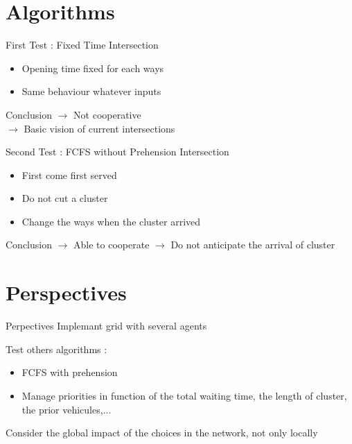 \documentclass[]{beamer}
\begin{document}
\section{Algorithms}
\begin{frame}{First Test : Fixed Time Intersection}
 \begin{itemize}
  \item Opening time fixed for each ways
  \item Same behaviour whatever inputs
 \end{itemize}
 \begin{block}{Conclusion}
  $\rightarrow$ Not cooperative\\
  $\rightarrow$ Basic vision of current intersections
 \end{block}
\end{frame}

\begin{frame}{Second Test : FCFS without Prehension Intersection}
 \begin{itemize}
  \item First come first served
  \item Do not cut a cluster
  \item Change the ways when the cluster arrived
 \end{itemize}
 \begin{block}{Conclusion}
  $\rightarrow$ Able to cooperate
  $\rightarrow$ Do not anticipate the arrival of cluster
 \end{block}
\end{frame}

\section{Perspectives}
\begin{frame}{Perpectives}
Implemant grid with several agents\vspace{0.5cm}

Test others algorithms :
 \begin{itemize}
  \item FCFS with prehension
  \item Manage priorities in function of the total waiting time, the length of cluster, the prior vehicules,...
 \end{itemize}
 \vspace{0.5cm}
Consider the global impact of the choices in the network, not only locally
\end{frame}
\end{document}
